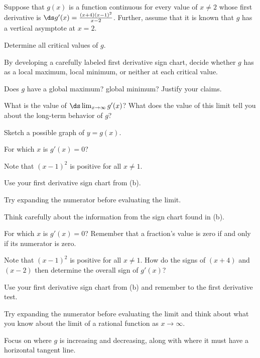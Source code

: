 \begin{activity} \label{A:3.1.1}  Suppose that $g(x)$ is a function continuous for every value of $x \ne 2$ whose first derivative is $\ds g'(x) = \frac{(x+4)(x-1)^2}{x-2}$.  Further, assume that it is known that $g$ has a vertical asymptote at $x = 2$.
\ba
  \item Determine all critical values of $g$.
  \item By developing a carefully labeled first derivative sign chart, decide whether $g$ has  as a local maximum, local minimum, or neither at each critical value.
  \item Does $g$ have a global maximum? global minimum? Justify your claims.
  \item What is the value of $\ds \lim_{x \to \infty} g'(x)$?  What does the value of this limit tell you about the long-term behavior of $g$?
  \item Sketch a possible graph of $y = g(x)$.
\ea
\end{activity}
\begin{smallhint}
\ba
	\item For which $x$ is $g'(x) = 0$?
	\item Note that $(x-1)^2$ is positive for all $x \ne 1$.
	\item Use your first derivative sign chart from (b).
	\item Try expanding the numerator before evaluating the limit.
	\item Think carefully about the information from the sign chart found in (b).
\ea
\end{smallhint}
\begin{bighint}
\ba
	\item For which $x$ is $g'(x) = 0$?  Remember that a fraction's value is zero if and only if its numerator is zero.
	\item Note that $(x-1)^2$ is positive for all $x \ne 1$.  How do the signs of $(x+4)$ and $(x-2)$ then determine the overall sign of $g'(x)$?
	\item Use your first derivative sign chart from (b) and remember to the first derivative test.
	\item Try expanding the numerator before evaluating the limit and think about what you know about the limit of a rational function as $x \to \infty$.
	\item Focus on where $g$ is increasing and decreasing, along with where it must have a horizontal tangent line.
\ea
\end{bighint}
